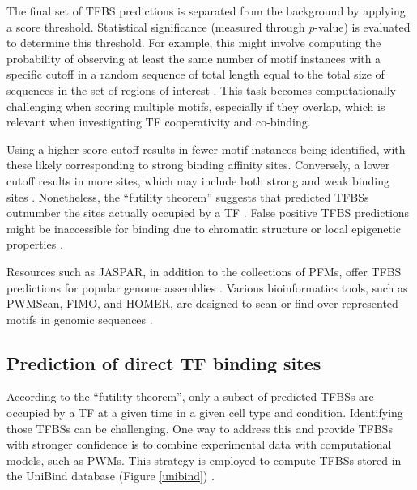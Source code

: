     The final set of TFBS predictions is separated from the background by applying a score threshold. Statistical significance (measured through \textit{p}-value) is evaluated to determine this threshold. For example, this might involve computing the probability of observing at least the same number of motif instances with a specific cutoff in a random sequence of total length equal to the total size of sequences in the set of regions of interest \cite{boeva2016analysis}. This task becomes computationally challenging when scoring multiple motifs, especially if they overlap, which is relevant when investigating TF cooperativity and co-binding.

    Using a higher score cutoff results in fewer motif instances being identified, with these likely corresponding to strong binding affinity sites. Conversely, a lower cutoff results in more sites, which may include both strong and weak binding sites \cite{boeva2016analysis}. Nonetheless, the ``futility theorem'' suggests that predicted TFBSs outnumber the sites actually occupied by a TF \cite{wasserman2004applied}. False positive TFBS predictions might be inaccessible for binding due to chromatin structure or local epigenetic properties \cite{mathelier2013next}.

    Resources such as JASPAR, in addition to the collections of PFMs, offer TFBS predictions for popular genome assemblies \cite{rauluseviciute2024jaspar}. Various bioinformatics tools, such as PWMScan, FIMO, and HOMER, are designed to scan or find over-represented motifs in genomic sequences \cite{weidemuller2021transcription,grant2011fimo,heinz2010simple}.

    \subsection{Prediction of direct TF binding sites}

    According to the ``futility theorem'', only a subset of predicted TFBSs are occupied by a TF at a given time in a given cell type and condition. Identifying those TFBSs can be challenging. One way to address this and provide TFBSs with stronger confidence is to combine experimental data with computational models, such as PWMs. This strategy is employed to compute TFBSs stored in the UniBind database ({Figure \ref{unibind}}) \cite{puig2021unibind,gheorghe2019map}.

